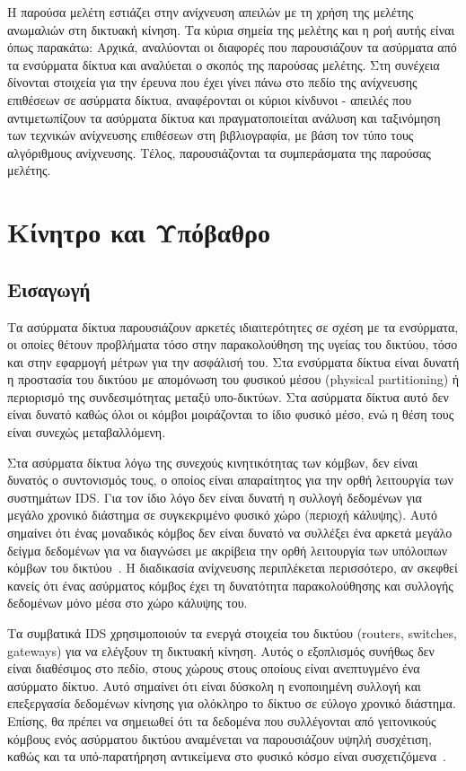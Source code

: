 \documentclass[12pt]{report}
\begin{document}
Η παρούσα μελέτη εστιάζει στην ανίχνευση απειλών με τη χρήση της μελέτης ανωμαλιών στη δικτυακή κίνηση. Τα κύρια σημεία της μελέτης και η ροή αυτής είναι όπως παρακάτω: Αρχικά, αναλύονται οι διαφορές που παρουσιάζουν τα ασύρματα από τα ενσύρματα δίκτυα και αναλύεται ο σκοπός της παρούσας μελέτης. Στη συνέχεια δίνονται στοιχεία για την έρευνα που έχει γίνει πάνω στο πεδίο της ανίχνευσης επιθέσεων σε ασύρματα δίκτυα, αναφέρονται οι κύριοι κίνδυνοι - απειλές που αντιμετωπίζουν τα ασύρματα δίκτυα και πραγματοποιείται ανάλυση και ταξινόμηση των τεχνικών ανίχνευσης επιθέσεων στη βιβλιογραφία, με βάση τον τύπο τους αλγόριθμους ανίχνευσης. Τέλος, παρουσιάζονται τα συμπεράσματα της παρούσας μελέτης.

\chapter{Κίνητρο και Υπόβαθρο}
\section{Εισαγωγή}
Τα ασύρματα δίκτυα παρουσιάζουν αρκετές ιδιαιτερότητες σε σχέση με τα ενσύρματα, οι οποίες θέτουν προβλήματα τόσο στην παρακολούθηση της υγείας του δικτύου, τόσο και στην εφαρμογή μέτρων για την ασφάλισή του. Στα ενσύρματα δίκτυα είναι δυνατή η προστασία του δικτύου με απομόνωση του φυσικού μέσου (\textlatin{physical partitioning}) ή περιορισμό της συνδεσιμότητας μεταξύ υπο-δικτύων. Στα ασύρματα δίκτυα αυτό δεν είναι δυνατό καθώς όλοι οι κόμβοι μοιράζονται το ίδιο φυσικό μέσο, ενώ η θέση τους είναι συνεχώς μεταβαλλόμενη.

Στα ασύρματα δίκτυα λόγω της συνεχούς κινητικότητας των κόμβων, δεν είναι δυνατός ο συντονισμός τους, ο οποίος είναι απαραίτητος για την ορθή λειτουργία των συστημάτων \textlatin{IDS}. Για τον ίδιο λόγο δεν είναι δυνατή η συλλογή δεδομένων για μεγάλο χρονικό διάστημα σε συγκεκριμένο φυσικό χώρο (περιοχή κάλυψης). Αυτό σημαίνει ότι ένας μοναδικός κόμβος δεν είναι δυνατό να συλλέξει ένα αρκετά μεγάλο δείγμα δεδομένων για να διαγνώσει με ακρίβεια την ορθή λειτουργία των υπόλοιπων κόμβων του δικτύου~\cite{paper:01}. Η διαδικασία ανίχνευσης περιπλέκεται περισσότερο, αν σκεφθεί κανείς ότι ένας ασύρματος κόμβος έχει τη δυνατότητα παρακολούθησης και συλλογής δεδομένων μόνο μέσα στο χώρο κάλυψης του.

Τα συμβατικά \textlatin{IDS} χρησιμοποιούν τα ενεργά στοιχεία του δικτύου (\textlatin{routers, switches, gateways}) για να ελέγξουν τη δικτυακή κίνηση. Αυτός ο εξοπλισμός συνήθως δεν είναι διαθέσιμος στο πεδίο, στους χώρους στους οποίους είναι ανεπτυγμένο ένα ασύρματο δίκτυο. Αυτό σημαίνει ότι είναι δύσκολη η ενοποιημένη συλλογή και επεξεργασία δεδομένων κίνησης για ολόκληρο το δίκτυο σε εύλογο χρονικό διάστημα. Επίσης, θα πρέπει να σημειωθεί ότι τα δεδομένα που συλλέγονται από γειτονικούς κόμβους ενός ασύρματου δικτύου αναμένεται να παρουσιάζουν υψηλή συσχέτιση, καθώς και τα υπό-παρατήρηση αντικείμενα στο φυσικό κόσμο είναι συσχετιζόμενα~\cite{paper:04}.
\end{document}
